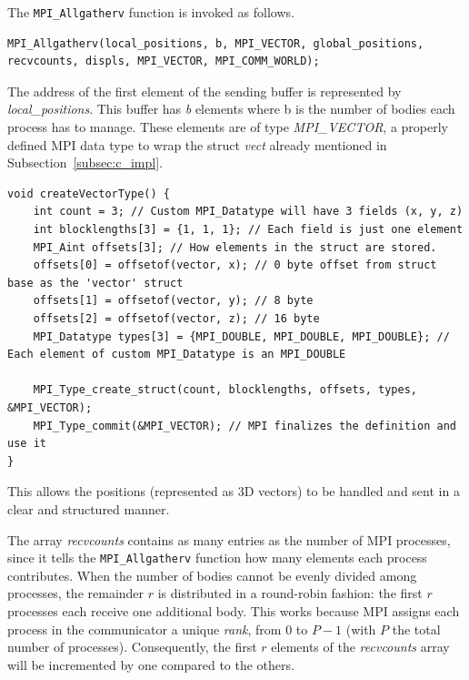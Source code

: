 \documentclass{article}
\begin{document}
The \texttt{MPI\_Allgatherv} function is invoked as follows.
\begin{lstlisting}
MPI_Allgatherv(local_positions, b, MPI_VECTOR, global_positions, recvcounts, displs, MPI_VECTOR, MPI_COMM_WORLD);
\end{lstlisting}
The address of the first element of the sending buffer is represented by \emph{local\_positions}. This buffer has \emph{b} elements where b is the number of bodies each process has to manage.
These elements are of type \emph{MPI\_VECTOR}, a properly defined MPI data type to wrap the struct \emph{vect} already mentioned in Subsection~\ref{subsec:c_impl}.
\begin{lstlisting}
void createVectorType() {
    int count = 3; // Custom MPI_Datatype will have 3 fields (x, y, z)
	int blocklengths[3] = {1, 1, 1}; // Each field is just one element
	MPI_Aint offsets[3]; // How elements in the struct are stored.
    offsets[0] = offsetof(vector, x); // 0 byte offset from struct base as the 'vector' struct
    offsets[1] = offsetof(vector, y); // 8 byte
    offsets[2] = offsetof(vector, z); // 16 byte
    MPI_Datatype types[3] = {MPI_DOUBLE, MPI_DOUBLE, MPI_DOUBLE}; // Each element of custom MPI_Datatype is an MPI_DOUBLE

    MPI_Type_create_struct(count, blocklengths, offsets, types, &MPI_VECTOR);
    MPI_Type_commit(&MPI_VECTOR); // MPI finalizes the definition and use it
}
\end{lstlisting}
This allows the positions (represented as 3D vectors) to be handled and sent in a clear and structured manner.

The array \emph{recvcounts} contains as many entries as the number of MPI processes, since it tells the \texttt{MPI\_Allgatherv} function how many elements each process contributes.
When the number of bodies cannot be evenly divided among processes, the remainder $r$ is distributed in a round-robin fashion: the first $r$ processes each receive one additional body.
This works because MPI assigns each process in the communicator a unique \emph{rank}, from $0$ to $P-1$ (with $P$ the total number of processes).
Consequently, the first $r$ elements of the \emph{recvcounts} array will be incremented by one compared to the others.
\end{document}
